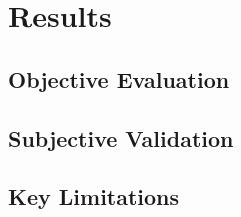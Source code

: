


\chapter{Results} %

\ifpdf
    \graphicspath{{5_Results/figures/PNG/}{5_Results/figures/PDF/}{5_Results/figures/}}
\else
    \graphicspath{{5_Results/figures/EPS/}{5_Results/figures/}}
\fi



\section{Objective Evaluation}

\section{Subjective Validation}

\section{Key Limitations}




